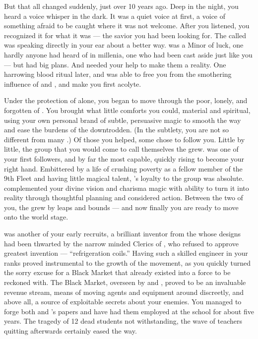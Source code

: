 \documentclass[char]{GL2020}
\begin{document}
But that all changed suddenly, just over 10 years ago. Deep in the night, you heard a voice whisper in the dark. It was a quiet voice at first, a voice of something afraid to be caught where it was not welcome. After you listened, you recognized it for what it was — the savior you had been looking for. The \cGenesis{\Deity} called \cGenesis{} was speaking directly in your ear about a better way. \cGenesis{} was a Minor \cGenesis{\Deity} of luck, one hardly anyone had heard of in millenia, one who had been cast aside just like you — but \cGenesis{} had big plans. And \cGenesis{\they} needed your help to make them a reality. One harrowing blood ritual later, and \cGenesis{} was able to free you from the smothering influence of \cEbb{\intro} and \cFlow{\intro}, and make you \cGenesis{\their} first acolyte.

Under the protection of \cGenesis{} alone, you began to move through the poor, lonely, and forgotten of \pEarth{}. You brought what little comforts you could, material and spiritual, using your own personal brand of subtle, persuasive magic to smooth the way and ease the burdens of the downtrodden. (In the subtlety, you are not so different from many \pShippies{}.) Of those you helped, some chose to follow you. Little by little, the group that you would come to call themselves the \pGoaties{} grew. \cChupSecond{\intro} was one of your first followers, and by far the most capable, quickly rising to become your right hand. Embittered by a life of crushing poverty as a fellow member of the 9th Fleet and having little magical talent, \cChupSecond{}'s loyalty to the group was absolute. \cChupSecond{\They} complemented your divine vision and charisma magic with \cChupSecond{\their} ability to turn it into reality through thoughtful planning and considered action. Between the two of you, the \pGoaties{} grew by leaps and bounds — and now finally you are ready to move onto the world stage.

\cChupInventor{\intro} was another of your early recruits, a brilliant inventor from the \pTech{} whose designs had been thwarted by the narrow minded Clerics of \cTechGod{\intro}, who refused to approve \cChupInventor{\their} greatest invention — ``refrigeration coils.'' Having such a skilled engineer in your ranks proved instrumental to the growth of the movement, as you quickly turned the sorry excuse for a Black Market that already existed into a force to be reckoned with. The Black Market, overseen by \cChupSecond{} and \cChupInventor{}, proved to be an invaluable revenue stream, means of moving agents and equipment around discreetly, and above all, a source of exploitable secrets about your enemies. You managed to forge both \cChupSecond{} and \cChupInventor{}’s papers and have had them employed at the school for about five years. The tragedy of 12 dead students not withstanding, the wave of teachers quitting afterwards certainly eased the way.
\end{document}
